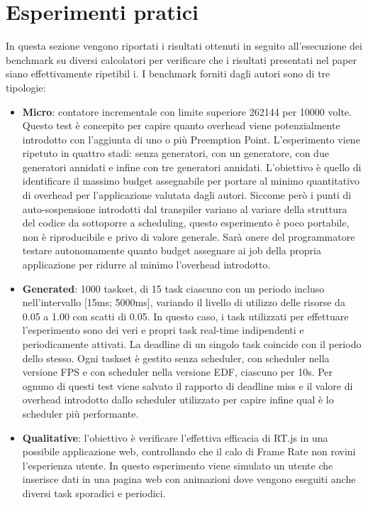 \documentclass[conference]{IEEEtran}
\begin{document}
\section{Esperimenti pratici}
In questa sezione vengono riportati i risultati ottenuti in seguito all'esecuzione dei benchmark su diversi calcolatori per verificare che i risultati presentati nel paper siano effettivamente ripetibil i.
\newline
I benchmark forniti dagli autori sono di tre tipologie:
\begin{itemize}
    \item \textbf{Micro}: contatore incrementale con limite superiore 262144 per 10000 volte. Questo test è concepito per capire quanto overhead viene potenzialmente introdotto con l'aggiunta di uno o più Preemption Point. L'esperimento viene ripetuto in quattro stadi: senza generatori, con un generatore, con due generatori annidati e infine con tre generatori annidati. L'obiettivo è quello di identificare il massimo budget assegnabile per portare al minimo quantitativo di overhead per l'applicazione valutata dagli autori. Siccome però i punti di auto-sospensione introdotti dal transpiler variano al variare della struttura del codice da sottoporre a scheduling, questo esperimento è poco portabile, non è riproducibile e privo di valore generale. Sarà onere del programmatore testare autonomamente quanto budget assegnare ai job della propria applicazione per ridurre al minimo l'overhead introdotto.
    \item \textbf{Generated}: 1000 taskset, di 15 task ciascuno con un periodo incluso nell'intervallo [15ms; 5000ms], variando il livello di utilizzo delle risorse da 0.05 a 1.00 con scatti di 0.05. In questo caso, i task utilizzati per effettuare l'esperimento sono dei veri e propri task real-time indipendenti e periodicamente attivati. La deadline di un singolo task coincide con il periodo dello stesso. Ogni taskset è gestito senza scheduler, con scheduler nella versione FPS e con scheduler nella versione EDF, ciascuno per 10s. Per ognuno di questi test viene salvato il rapporto di deadline miss e il valore di overhead introdotto dallo scheduler utilizzato per capire infine qual è lo scheduler più performante.
    \item \textbf{Qualitative}: l'obiettivo è verificare l'effettiva efficacia di RT.js in una possibile applicazione web, controllando che il calo di Frame Rate non rovini l'esperienza utente. In questo esperimento viene simulato un utente che inserisce dati in una pagina web con animazioni dove vengono eseguiti anche diversi task sporadici e periodici. 

\end{itemize}
\end{document}
